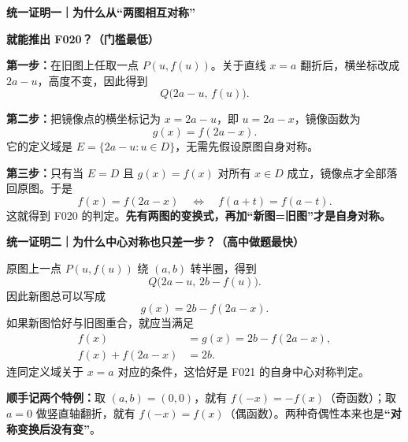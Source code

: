\clearpage
\begin{proofbox}
\textbf{统一证明一｜为什么从“两图相互对称”}\par
\textbf{就能推出 F020？（门槛最低）}


\textbf{第一步：}在旧图上任取一点 $P(u,f(u))$。关于直线 $x=a$ 翻折后，横坐标改成 $2a-u$，高度不变，因此得到
\[Q\bigl(2a-u,\,f(u)\bigr).\]

\textbf{第二步：}把镜像点的横坐标记为 $x=2a-u$，即 $u=2a-x$，镜像函数为
\[\boxed{g(x)=f(2a-x)}.\]
它的定义域是 $E=\{2a-u:u\in D\}$，无需先假设原图自身对称。

\textbf{第三步：}只有当 $E=D$ 且 $g(x)=f(x)$ 对所有 $x\in D$ 成立，镜像点才全部落回原图。于是
\[\boxed{f(x)=f(2a-x)}\quad\Longleftrightarrow\quad
\boxed{f(a+t)=f(a-t)}.\]
这就得到 F020 的判定。\textbf{先有两图的变换式，再加“新图=旧图”才是自身对称。}
\end{proofbox}
\clearpage
\begin{proofbox}
\textbf{统一证明二｜为什么中心对称也只差一步？（高中做题最快）}


原图上一点 $P(u,f(u))$ 绕 $(a,b)$ 转半圈，得到
\[Q\bigl(2a-u,\,2b-f(u)\bigr).\]
因此新图总可以写成
\[\boxed{g(x)=2b-f(2a-x)}.\]
如果新图恰好与旧图重合，就应当满足
\[
\begin{aligned}
  f(x)&=g(x)=2b-f(2a-x),\\
  \boxed{f(x)+f(2a-x)}&\boxed{=2b}.
\end{aligned}
\]
连同定义域关于 $x=a$ 对应的条件，这恰好是 F021 的自身中心对称判定。

\textbf{顺手记两个特例：}取 $(a,b)=(0,0)$，就有 $f(-x)=-f(x)$（奇函数）；取 $a=0$ 做竖直轴翻折，就有 $f(-x)=f(x)$（偶函数）。两种奇偶性本来也是\textbf{“对称变换后没有变”}。
\end{proofbox}


